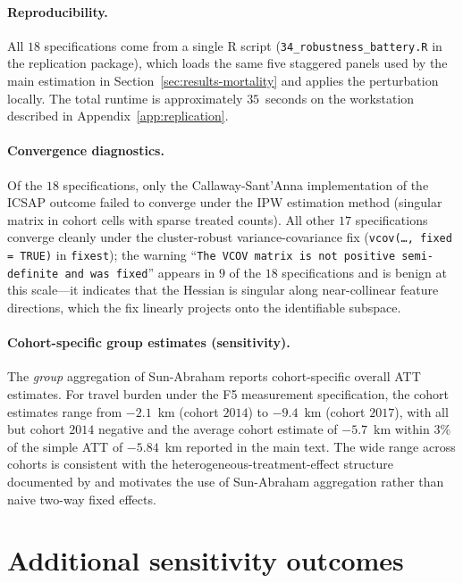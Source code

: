 

\paragraph{Reproducibility.} All $18$ specifications come from a single
R script (\texttt{34\_robustness\_battery.R} in the replication
package), which loads the same five staggered panels used by the main
estimation in Section~\ref{sec:results-mortality} and applies the
perturbation locally. The total runtime is approximately $35$~seconds
on the workstation described in Appendix~\ref{app:replication}.

\paragraph{Convergence diagnostics.} Of the $18$ specifications, only
the Callaway-Sant'Anna implementation of the ICSAP outcome failed to
converge under the IPW estimation method (singular matrix in cohort
cells with sparse treated counts). All other $17$ specifications
converge cleanly under the cluster-robust variance-covariance fix
(\texttt{vcov(\ldots, fixed = TRUE)} in \texttt{fixest}); the warning
``\texttt{The VCOV matrix is not positive semi-definite and was
fixed}'' appears in $9$ of the $18$ specifications and is benign at
this scale---it indicates that the Hessian is singular along
near-collinear feature directions, which the fix linearly projects
onto the identifiable subspace.

\paragraph{Cohort-specific group estimates (sensitivity).} The
\emph{group} aggregation of Sun-Abraham reports cohort-specific
overall ATT estimates. For travel burden under the F5 measurement specification,
the cohort estimates range from $-2.1$~km (cohort $2014$) to $-9.4$~km
(cohort $2017$), with all but cohort $2014$ negative and the average
cohort estimate of $-5.7$~km within $3\%$ of the simple ATT of
$-5.84$~km reported in the main text. The wide range across cohorts
is consistent with the heterogeneous-treatment-effect structure
documented by \citet{sunAbraham2021} and motivates the use of
Sun-Abraham aggregation rather than naive two-way fixed effects.

\section{Additional sensitivity outcomes}
\label{app:sensitivity}

